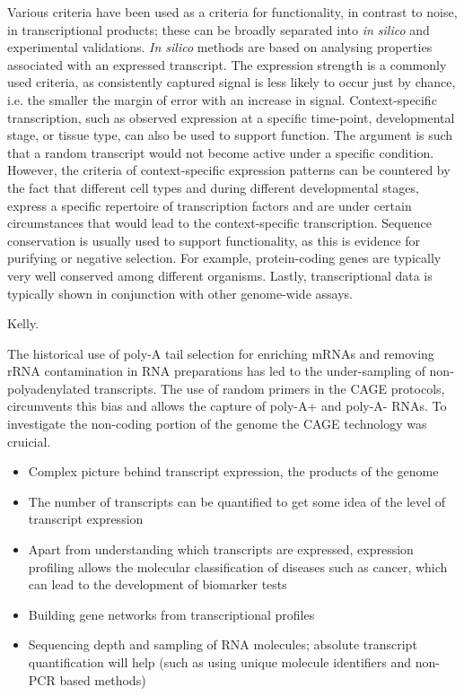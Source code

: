Various criteria have been used as a criteria for functionality, in contrast to noise, in transcriptional products; these can be broadly separated into \textit{in silico} and experimental validations. \textit{In silico} methods are based on analysing properties associated with an expressed transcript. The expression strength is a commonly used criteria, as consistently captured signal is less likely to occur just by chance, i.e. the smaller the margin of error with an increase in signal. Context-specific transcription, such as observed expression at a specific time-point, developmental stage, or tissue type, can also be used to support function. The argument is such that a random transcript would not become active under a specific condition. However, the criteria of context-specific expression patterns can be countered by the fact that different cell types and during different developmental stages, express a specific repertoire of transcription factors and are under certain circumstances that would lead to the context-specific transcription. Sequence conservation is usually used to support functionality, as this is evidence for purifying or negative selection. For example, protein-coding genes are typically very well conserved among different organisms. Lastly, transcriptional data is typically shown in conjunction with other genome-wide assays.

Kelly\cite{pmid23181609}.

The historical use of poly-A tail selection for enriching mRNAs and removing rRNA contamination in RNA preparations has led to the under-sampling of non-polyadenylated transcripts. The use of random primers in the CAGE protocols, circumvents this bias and allows the capture of poly-A+ and poly-A- RNAs. To investigate the non-coding portion of the genome the CAGE technology was cruicial.

\begin{itemize}
   \item Complex picture behind transcript expression, the products of the genome
   \item The number of transcripts can be quantified to get some idea of the level of transcript expression
   \item Apart from understanding which transcripts are expressed, expression profiling allows the molecular classification of diseases such as cancer, which can lead to the development of biomarker tests   \item Building gene networks from transcriptional profiles
   \item Sequencing depth and sampling of RNA molecules; absolute transcript quantification will help (such as using unique molecule identifiers and non-PCR based methods)
\end{itemize}


